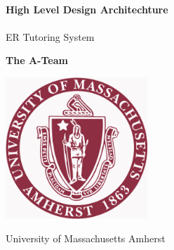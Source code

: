 \begin{titlepage}
    \begin{center}
        \vspace*{1cm}
        
 
        \HRule \\[0.4cm]
        {   \huge\textbf{High Level Design Architechture}\\[0.4cm] }
        \HRule \\[1cm]
       
        
        \vspace{0.5cm}
        \LARGE
        ER Tutoring System
        
        \vspace{1.5cm}
        
        \textbf{The A-Team}
        
        \vfill

        \vspace{0.8cm}
        
        \includegraphics[width=0.4\textwidth]{UMASS_logo}
        
        \Large
University of Massachusetts Amherst
        
    \end{center}
\end{titlepage}
